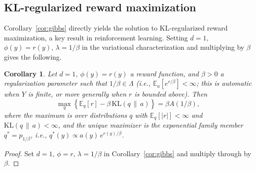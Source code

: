 \documentclass[11pt, a4paper, 
onecolumn, 
showabstract]{naverlabseurope-onecol-flex}
\newtheorem{corollary}[theorem]{Corollary}
\theoremstyle{definition}
\theoremstyle{remark}
\newcommand{\KL}[2]{\mathrm{KL}\!\left(#1 \,\|\, #2\right)}
\newcommand{\E}{\mathbb{E}}
\begin{document}
\subsection{KL-regularized reward maximization}\label{sec:klcontrol}

Corollary~\ref{cor:gibbs} directly yields the solution to KL-regularized reward maximization, a key result in reinforcement learning. Setting $d=1$, $\phi(y)=r(y)$, $\lambda=1/\beta$ in the variational characterization and multiplying by $\beta$ gives the following.

\begin{corollary}\label{cor:rl}
Let $d = 1$, $\phi(y) = r(y)$ a reward function, and $\beta > 0$ a regularization parameter such that $1/\beta \in \Lambda$ (i.e., $\E_a[e^{r/\beta}] < \infty$; this is automatic when $Y$ is finite, or more generally when $r$ is bounded above).
Then
\[
    \max_q \left\{ \E_q[r] - \beta\, \KL{q}{a} \right\}
    = \beta A(1/\beta),
\]
where the maximum is over distributions $q$ with $\E_q[|r|] < \infty$ and $\KL{q}{a} < \infty$,
and the unique maximizer is the exponential family member $q^* = p_{1/\beta}$, i.e., $q^*(y) \propto a(y)\, e^{r(y)/\beta}$.
\end{corollary}

\begin{proof}
Set $d=1$, $\phi=r$, $\lambda=1/\beta$ in Corollary~\ref{cor:gibbs} and multiply through by $\beta$.
\end{proof}
\end{document}
